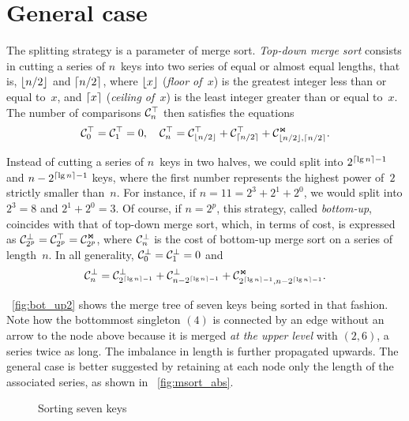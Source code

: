 \section{General case}

The splitting strategy is a parameter of merge sort. \emph{Top-down
  merge sort} consists in cutting a series of \(n\)~keys into two
series of equal or almost equal lengths, that is, \(\lfloor{n/2}\rfloor\) and
\(\lceil{n/2}\rceil\), where \(\lfloor{x}\rfloor\) (\textsl{floor of~\(x\)}) is
the greatest integer less than or equal to~\(x\), and \(\lceil{x}\rceil\)
(\textsl{ceiling of~\(x\)}) is the least integer greater than or equal
to~\(x\). The number of comparisons \(\mathcal{C}_{n}^{\top}\) then satisfies the
equations
\begin{equation}
\mathcal{C}_{0}^{\top} = \mathcal{C}_{1}^{\top} = 0,\quad
\mathcal{C}_{n}^{\top} = \mathcal{C}_{\lfloor{n/2}\rfloor}^{\top}
+ \mathcal{C}_{\lceil{n/2}\rceil}^{\top}
+ \mathcal{C}_{\lfloor{n/2}\rfloor,\lceil{n/2}\rceil}^{\Join}.
\label{eq:Ctop}
\end{equation}

Instead of cutting a series of \(n\)~keys in two halves, we could
split into \(2^{\lceil{\lg n}\rceil-1}\) and \(n-2^{\lceil{\lg n}\rceil-1}\)
keys, where the first number represents the highest power of~\(2\)
strictly smaller than~\(n\). For instance, if \(n=11=2^3+2^1+2^0\), we
would split into \(2^3=8\) and \(2^1+2^0=3\). Of course, if \(n=2^p\),
this strategy, called \emph{bottom-up}, coincides with that of
top-down merge sort, which, in terms of cost, is expressed as
\(\mathcal{C}_{2^p}^{\bot} = \mathcal{C}_{2^p}^{\top} = \mathcal{C}_{2^p}^{\Join}\), where
\(\mathcal{C}_{n}^{\bot}\) is the cost of bottom-up merge sort on a series
of length~\(n\). In all generality, \(\mathcal{C}_{0}^{\bot} = \mathcal{C}_{1}^{\bot} = 0\) and
\begin{equation}
\mathcal{C}_{n}^{\bot} = \mathcal{C}_{2^{\lceil{\lg n}\rceil-1}}^{\bot}
  + \mathcal{C}_{n - 2^{\lceil{\lg n}\rceil-1}}^{\bot} + \mathcal{C}_{2^{\lceil{\lg
        n}\rceil-1},n - 2^{\lceil{\lg n}\rceil-1}}^{\Join}.
\label{eq:cost_bms}
\end{equation}

\Fig~\ref{fig:bot_up2} shows the merge tree of seven keys being sorted in that fashion. Note how the bottommost singleton \((4)\) is connected by an edge without an arrow to the node above because it is merged \emph{at the upper level} with \((2,6)\), a series twice as long. The imbalance in length is further propagated upwards. The general case is better suggested by retaining at each node only the length of the associated series, as shown in \fig~\ref{fig:msort_abs}.
\begin{figure}
\centering
{} \qquad
{}
\caption{Sorting seven keys}
\end{figure}

